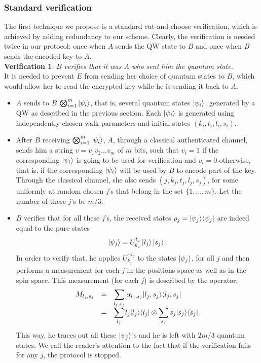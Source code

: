 \subsubsection{Standard verification}
\label{sec:stdver}
The first technique we propose is a standard cut-and-choose verification, which is achieved by adding redundancy to our scheme. Clearly, the verification is needed twice in our protocol: once when $A$ sends the QW state to $B$ and once when $B$ sends the encoded key to $A$.\\ 

\textbf{Verification 1}: \textit{$B$ verifies that it was $A$ who sent him the quantum state.}\\
It is needed to prevent $E$ from sending her choice of quantum states to $B$, which would allow her to read the encrypted key while he is sending it back to $A$. 
	\begin{itemize}
		\item $A$ sends to $B$ $\bigotimes_{i=1}^{m}| \psi_i \rangle$, that is, several quantum states $| \psi_i \rangle$, generated by a QW as described in the previous section. Each $| \psi_i \rangle$ is generated using independently chosen walk parameters and initial states $(k_i,t_i,l_i,s_i)$.
			
		\item After $B$ receiving $\bigotimes_{i=1}^{m}| \psi_i \rangle$, $A$, through a classical authenticated channel, sends him a string $v=v_1v_2\ldots v_m$ of $m$ bits, such that $v_i=1$ if the corresponding $| \psi_i \rangle$ is going to be used for verification and $v_i=0$ otherwise, that is, if the corresponding $| \psi_i \rangle$ will be used by $B$ to encode part of the key. Through the classical channel, she also sends $(j,k_j,t_j,l_j,s_j)$, for some uniformly at random chosen $j$'s that belong in the set $\{1,\ldots,m\}$. Let the number of these $j$'s be $m/3$.
		\item $B$ verifies that for all these $j$'s, the received states $\rho_j=| \psi_j \rangle\langle \psi_j |$ are indeed equal to the pure states 
		$$\Ket{\psi_j} 	= U_{k_j}^{t_{j}}\Ket{l_j}\Ket{s_j}. $$
		In order to verify that, he applies $U_{k_j}^{-t_j}$ to the states $| \psi_j \rangle$, for all $j$ and then performs a measurement for each $j$ in the positions space as well as in the spin space. This measurement (for each $j$) is described by the operator:
		\[
		\begin{array}{rcl}
		M_{l_j,s_j}&=&\displaystyle \sum_{l_j,s_j}\alpha_{l_j,s_j}| l_j,s_j \rangle\langle l_j,s_j |\\
		&=&\displaystyle \sum_{l_j}l_j| l_j \rangle\langle l_j |\otimes\sum_{s_j}s_j| s_j \rangle\langle s_j |.
		\end{array}
		\]
		This way, he traces out all these $| \psi_j \rangle$'s and he is left with $2m/3$ quantum states. We call the reader's attention to the fact that if the verification fails for any $j$, the protocol is stopped.
 		\end{itemize}


